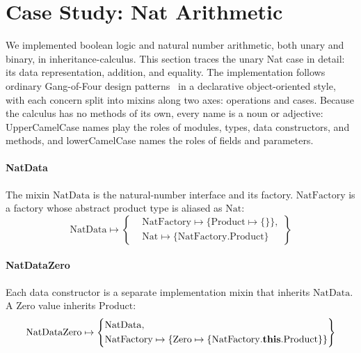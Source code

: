 \section{Case Study: Nat Arithmetic}
\label{sec:case-study}
\label{sec:expression-problem}

We implemented boolean logic and natural number arithmetic, both unary
and binary, in inheritance-calculus.
This section traces the unary Nat case in detail: its data representation,
addition, and equality.
The implementation follows ordinary Gang-of-Four design
patterns~\cite{gamma1994-design-patterns} in a declarative object-oriented
style, with each concern split into mixins along two axes: operations and
cases. Because the calculus has no methods of its own, every name is a noun or
adjective: UpperCamelCase names play the roles of modules, types, data
constructors, and methods, and lowerCamelCase names the roles of fields and
parameters.

\paragraph{NatData}
The mixin $\mathrm{NatData}$ is the natural-number interface and its factory.
$\mathrm{NatFactory}$ is a factory whose abstract product type is aliased as $\mathrm{Nat}$:
\[
  \mathrm{NatData} \mapsto \left\{
    \begin{aligned}
      &\mathrm{NatFactory} \mapsto \{\mathrm{Product} \mapsto \{\}\},\\
      &\mathrm{Nat} \mapsto \{\mathrm{NatFactory}.\mathrm{Product}\}
  \end{aligned}\right\}
\]

\paragraph{NatDataZero}
Each data constructor is a separate implementation mixin that inherits
$\mathrm{NatData}$.
A $\mathrm{Zero}$ value inherits $\mathrm{Product}$:
\[
  \mathrm{NatDataZero} \mapsto \left\{
    \begin{aligned}
      &\mathrm{NatData},\\
      &\mathrm{NatFactory} \mapsto \{\mathrm{Zero} \mapsto \{\mathrm{NatFactory}.\mathbf{this}.\mathrm{Product}\}\}
  \end{aligned}\right\}
\]

